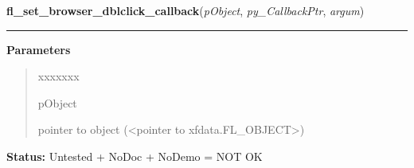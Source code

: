 \hspace{.8\funcindent}\begin{boxedminipage}{\funcwidth}

    \raggedright \textbf{fl\_set\_browser\_dblclick\_callback}(\textit{pObject}, \textit{py\_CallbackPtr}, \textit{argum})

    \vspace{-1.5ex}

    \rule{\textwidth}{0.5\fboxrule}
\setlength{\parskip}{2ex}
\setlength{\parskip}{1ex}
      \textbf{Parameters}
      \vspace{-1ex}

      \begin{quote}
        \begin{Ventry}{xxxxxxx}

          \item[pObject]

          pointer to object ({\textless}pointer to 
          xfdata.FL\_OBJECT{\textgreater})

        \end{Ventry}

      \end{quote}

\textbf{Status:} Untested + NoDoc + NoDemo = NOT OK



    \end{boxedminipage}

    \label{xformslib:library:fl_get_browser_xoffset}

    \vspace{0.5ex}

